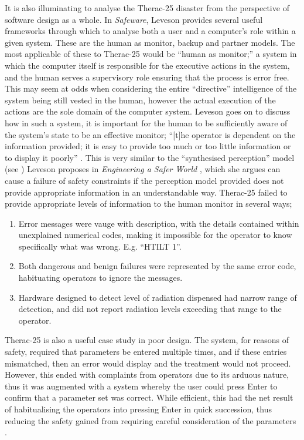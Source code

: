 \documentclass{cshonours}
\newcommand{\ther}{Therac-25\xspace}
\begin{document}
It is also illuminating to analyse the \ther disaster from the perspective of software design as a whole. In \textit{Safeware}, Leveson \cite{safeware} provides several useful frameworks through which to analyse both a user and a computer's role within a given system. These are the human as monitor, backup and partner models. The most applicable of these to \ther would be ``human as monitor;'' a system in which the computer itself is responsible for the executive actions in the system, and the human serves a supervisory role ensuring that the process is error free. This may seem at odds when considering the entire ``directive'' intelligence of the system being still vested in the human, however the actual execution of the actions are the sole domain of the computer system. Leveson goes on to discuss how in such a system, it is important for the human to be sufficiently aware of the system's state to be an effective monitor; ``[t]he operator is dependent on the information provided; it is easy to provide too much or too little information or to display it poorly'' \cite[p.~114]{safeware}. This is very similar to the ``synthesised perception'' model (see ) Leveson proposes in \textit{Engineering a Safer World} \cite[pp.~77--9]{saferworld}, which she argues can cause a failure of safety constraints if the perception model provided does not provide appropriate information in an understandable way. \ther failed to provide appropriate levels of information to the human monitor in several ways;
\begin{enumerate}
  \item Error messages were vauge with description, with the details contained within unexplained numerical codes, making it impossible for the operator to know specifically what was wrong. E.g. ``HTILT 1''.
  \item Both dangerous and benign failures were represented by the same error code, habituating operators to ignore the messages.
  \item Hardware designed to detect level of radiation dispensed had narrow range of detection, and did not report radiation levels exceeding that range to the operator.
\end{enumerate}



\ther is also a useful case study in poor \hci design. The system, for reasons of safety, required that parameters be entered multiple times, and if these entries mismatched, then an error would display and the treatment would not proceed. However, this ended with complaints from operators due to its arduous nature, thus it was augmented with a system whereby the user could press Enter to confirm that a parameter set was correct. While efficient, this had the net result of habitualising the operators into pressing Enter in quick succession, thus reducing the safety gained from requiring careful consideration of the parameters \cite[p.~274]{saferworld}.
\end{document}
